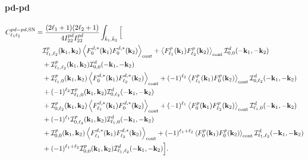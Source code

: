 \documentclass[a4paper,11pt]{article}
\begin{document}
\paragraph{pd-pd}
\begin{align}
C^{pd-pd,{\rm SN}}_{\ell_1\ell_2}
&=
\frac{(2\ell_1+1)(2\ell_2+1)}
{4I^{pd}_{22}I^{pd}_{22}}
\int_{\hat k_1,\hat k_2}
\Big[
\nonumber\\
&\quad
\mathcal I^p_{\ell_1,\ell_2}(\mathbf k_1,\mathbf k_2)
\left\langle
F^{d,*}_{0}(\mathbf k_1)F^{d,*}_{0}(\mathbf k_2)
\right\rangle_{\rm cont}
+
\left\langle
F^p_{\ell_1}(\mathbf k_1)F^p_{\ell_2}(\mathbf k_2)
\right\rangle_{\rm cont}
\mathcal I^d_{0,0}(-\mathbf k_1,-\mathbf k_2)
\nonumber\\
&\quad+
\mathcal I^p_{\ell_1,\ell_2}(\mathbf k_1,\mathbf k_2)
\mathcal I^d_{0,0}(-\mathbf k_1,-\mathbf k_2)
\nonumber\\
&\quad+
\mathcal I^p_{\ell_1,0}(\mathbf k_1,\mathbf k_2)
\left\langle
F^{d,*}_{0}(\mathbf k_1)F^{d,*}_{\ell_2}(\mathbf k_2)
\right\rangle_{\rm cont}
\nonumber+
(-1)^{\ell_2}
\left\langle
F^p_{\ell_1}(\mathbf k_1)F^p_{0}(\mathbf k_2)
\right\rangle_{\rm cont}
\mathcal I^d_{0,\ell_2}(-\mathbf k_1,-\mathbf k_2)
\nonumber\\
&\quad+
(-1)^{\ell_2}
\mathcal I^p_{\ell_1,0}(\mathbf k_1,\mathbf k_2)
\mathcal I^d_{0,\ell_2}(-\mathbf k_1,-\mathbf k_2)
\nonumber\\
&\quad+
\mathcal I^p_{0,\ell_2}(\mathbf k_1,\mathbf k_2)
\left\langle
F^{d,*}_{\ell_1}(\mathbf k_1)F^{d,*}_{0}(\mathbf k_2)
\right\rangle_{\rm cont}
\nonumber
+
(-1)^{\ell_1}
\left\langle
F^p_{0}(\mathbf k_1)F^p_{\ell_2}(\mathbf k_2)
\right\rangle_{\rm cont}
\mathcal I^d_{\ell_1,0}(-\mathbf k_1,-\mathbf k_2)
\nonumber\\
&\quad+
(-1)^{\ell_1}
\mathcal I^p_{0,\ell_2}(\mathbf k_1,\mathbf k_2)
\mathcal I^d_{\ell_1,0}(-\mathbf k_1,-\mathbf k_2)
\nonumber\\
&\quad+
\mathcal I^p_{0,0}(\mathbf k_1,\mathbf k_2)
\left\langle
F^{d,*}_{\ell_1}(\mathbf k_1)F^{d,*}_{\ell_2}(\mathbf k_2)
\right\rangle_{\rm cont}
+
(-1)^{\ell_1+\ell_2}
\left\langle
F^p_{0}(\mathbf k_1)F^p_{0}(\mathbf k_2)
\right\rangle_{\rm cont}
\mathcal I^d_{\ell_1,\ell_2}(-\mathbf k_1,-\mathbf k_2)
\nonumber\\
&\quad+
(-1)^{\ell_1+\ell_2}
\mathcal I^p_{0,0}(\mathbf k_1,\mathbf k_2)
\mathcal I^d_{\ell_1,\ell_2}(-\mathbf k_1,-\mathbf k_2)
\Big].
\end{align}
\end{document}
